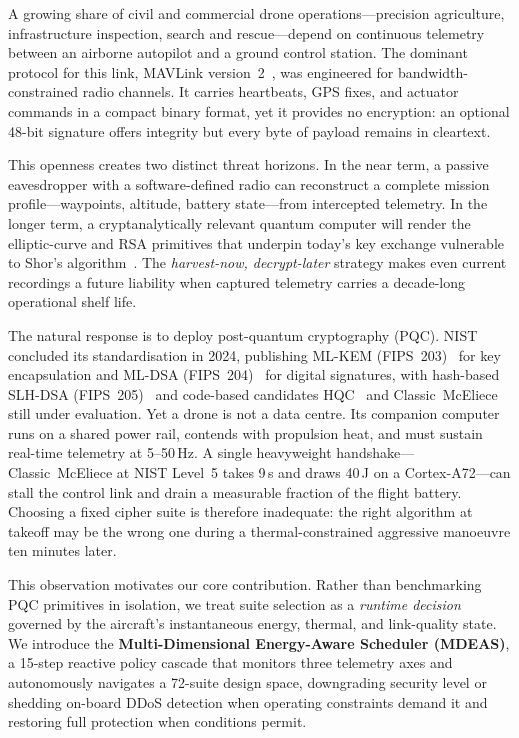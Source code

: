 \documentclass[conference]{IEEEtran}
\newcommand{\mdeas}{\textsc{MDEAS}}
\begin{document}
A growing share of civil and commercial drone operations---precision
agriculture, infrastructure inspection, search and rescue---depend on
continuous telemetry between an airborne autopilot and a ground
control station.  The dominant protocol for this link, MAVLink
version~2~\cite{mavlink-spec}, was engineered for bandwidth-constrained
radio channels.  It carries heartbeats, GPS fixes, and actuator
commands in a compact binary format, yet it provides no encryption:
an optional 48-bit signature offers integrity but every byte of
payload remains in cleartext.

This openness creates two distinct threat horizons.  In the near
term, a passive eavesdropper with a software-defined radio can
reconstruct a complete mission profile---waypoints, altitude, battery
state---from intercepted telemetry.  In the longer term, a
cryptanalytically relevant quantum computer will render the
elliptic-curve and RSA primitives that underpin today's key exchange
vulnerable to Shor's algorithm~\cite{shor1994}.  The
\emph{harvest-now, decrypt-later} strategy makes even current
recordings a future liability when captured telemetry carries a
decade-long operational shelf life.

The natural response is to deploy post-quantum cryptography (PQC).
NIST concluded its standardisation in 2024, publishing ML-KEM
(FIPS~203)~\cite{nist-fips203} for key encapsulation and ML-DSA
(FIPS~204)~\cite{nist-fips204} for digital signatures, with
hash-based SLH-DSA (FIPS~205)~\cite{nist-fips205} and code-based
candidates HQC~\cite{hqc} and Classic~McEliece~\cite{mceliece} still
under evaluation.  Yet a drone is not a data centre.  Its companion
computer runs on a shared power rail, contends with propulsion heat,
and must sustain real-time telemetry at 5--50\,Hz.  A single
heavyweight handshake---Classic~McEliece at NIST Level~5 takes 9\,s
and draws 40\,J on a Cortex-A72---can stall the control link and
drain a measurable fraction of the flight battery.  Choosing a fixed
cipher suite is therefore inadequate: the right algorithm at takeoff
may be the wrong one during a thermal-constrained aggressive
manoeuvre ten minutes later.

This observation motivates our core contribution.  Rather than
benchmarking PQC primitives in isolation, we treat suite selection as
a \emph{runtime decision} governed by the aircraft's instantaneous
energy, thermal, and link-quality state.  We introduce the
\textbf{Multi-Dimensional Energy-Aware Scheduler (\mdeas{})}, a
15-step reactive policy cascade that monitors three telemetry axes
and autonomously navigates a 72-suite design space, downgrading
security level or shedding on-board DDoS detection when
operating constraints demand it and restoring full protection when
conditions permit.
\end{document}
